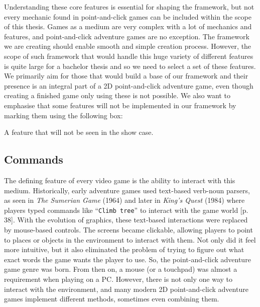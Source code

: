 Understanding these core features is essential for shaping the framework, but not every mechanic found in point-and-click games can be included within the scope of this thesis. Games as a medium are very complex with a lot of mechanics and features, and point-and-click adventure games are no exception. The framework we are creating should enable smooth and simple creation process. However, the scope of such framework that would handle this huge variety of different features is quite large for a bachelor thesis and so we need to select a set of these features. We primarily aim for those that would build a base of our framework and their presence is an integral part of a 2D point-and-click adventure game, even though creating a finished game only using these is not possible. We also want to emphasise that some features will not be implemented in our framework by marking them using the following box:


\begin{notImplemented}
 \par
\vspace{3mm}
A feature that will not be seen in the show case.
\end{notImplemented}

\subsection{Commands}
\label{sec:Commands}
The defining feature of every video game is the ability to interact with this medium. Historically, early adventure games used text-based verb-noun parsers, as seen in \textit{The Sumerian Game} (1964) and later in \textit{King's Quest} (1984) where players typed commands like “\texttt{Climb tree}” to interact with the game world \cite{Salter2014}[p. 38]. With the evolution of graphics, these text-based interactions were replaced by mouse-based controls. The screens
became clickable, allowing players to point to places or objects in the environment to interact with them.  Not only did it feel more intuitive, but it also eliminated the problem of trying to figure out what exact words the game wants the player to use. So, the point-and-click adventure game genre was born. From then on, a mouse (or a touchpad) was almost a requirement when playing on a PC. However, there is not only one way to interact with the environment, and many modern 2D point-and-click adventure games implement different methods, sometimes even combining them.

